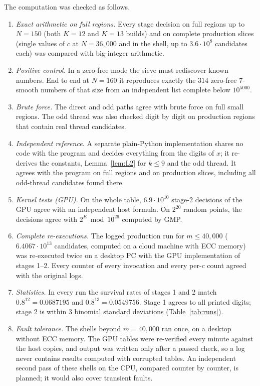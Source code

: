 \documentclass[11pt]{article}
\theoremstyle{definition}
\begin{document}
The computation was checked as follows.
\begin{enumerate}
\item \emph{Exact arithmetic on full regions.} Every stage decision on full regions up to $N=150$ (both $K=12$ and
  $K=13$ builds) and on complete production slices (single values of $c$ at $N=36{,}000$ and in the shell, up to
  $3.6\cdot10^8$ candidates each) was compared with big-integer arithmetic.
\item \emph{Positive control.} In a zero-free mode the sieve must rediscover known numbers. End to end at $N=160$ it
  reproduces exactly the $314$ zero-free $7$-smooth numbers of that size from an independent list complete below
  $10^{5000}$.
\item \emph{Brute force.} The direct and odd paths agree with brute force on full small regions. The odd thread was also
  checked digit by digit on production regions that contain real thread candidates.
\item \emph{Independent reference.} A separate plain-Python implementation shares no code with the program and decides
  everything from the digits of $x$; it re-derives the constants, Lemma~\ref{lem:L2} for $k\le9$ and the odd thread. It
  agrees with the program on full regions and on production slices, including all odd-thread candidates found there.
\item \emph{Kernel tests (GPU).} On the whole table, $6.9\cdot10^{10}$ stage-2 decisions of the GPU agree with an
  independent host formula. On $2^{20}$ random points, the decisions agree with $2^E\bmod10^{26}$ computed by GMP.
\item \emph{Complete re-executions.} The logged production run for $m\le40{,}000$ ($6.4067\cdot10^{13}$ candidates, computed on a cloud machine with
  ECC memory) was re-executed twice on a desktop PC with the GPU implementation of stages 1--2. Every counter of every
  invocation and every per-$c$ count agreed with the original logs.
\item \emph{Statistics.} In every run the survival rates of stages 1 and 2 match $0.8^{12}=0.0687195$ and
  $0.8^{13}=0.0549756$. Stage 1 agrees to all printed digits; stage 2 is within $3$ binomial standard deviations
  (Table~\ref{tab:runs}).
\item \emph{Fault tolerance.} The shells beyond $m=40{,}000$ ran once, on a desktop without ECC memory. The GPU tables
  were re-verified every minute against the host copies, and output was written only after a passed check, so a log
  never contains results computed with corrupted tables. An independent second pass of these shells on the CPU,
  compared counter by counter, is planned; it would also cover transient faults.
\end{enumerate}
\end{document}
